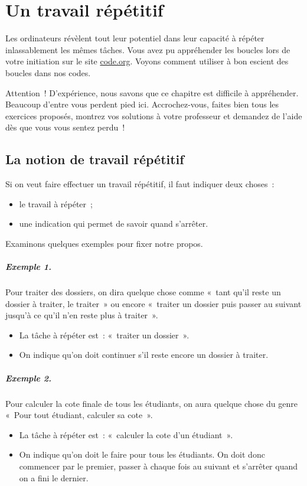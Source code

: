 \chapter{Un travail répétitif}
\label{chap:bcl}

	Les ordinateurs révèlent tout leur potentiel dans leur capacité à
	répéter inlassablement les mêmes tâches.
	Vous avez pu appréhender les boucles lors de votre initiation
	sur le site \url{code.org}.
	Voyons comment utiliser à bon escient des boucles dans nos codes.

	Attention~! 
	D’expérience, nous savons que ce chapitre est difficile à appréhender. 
	Beaucoup d’entre vous perdent pied ici. 
	Accrochez-vous, faites bien tous les exercices proposés,
	montrez vos solutions à votre professeur
	et demandez de l’aide dès que vous vous sentez perdu~!

\section{La notion de travail répétitif}

	Si on veut faire effectuer un travail répétitif, 
	il faut indiquer deux choses~:
	\begin{itemize}
	\item le travail à répéter~;
	\item une indication qui permet de savoir quand s’arrêter.
	\end{itemize}

	Examinons quelques exemples pour fixer notre propos.

	\paragraph{Exemple 1.} 
	Pour traiter des dossiers, 
	on dira quelque chose comme 
	«~tant qu’il reste un dossier à traiter, le traiter~» 
	ou encore 
	«~traiter un dossier puis passer au suivant jusqu’à ce qu’il n’en reste plus à traiter~».
	\begin{itemize}
	\item La tâche à répéter est~: «~traiter un dossier~».
	\item On indique qu’on doit continuer s’il reste encore un dossier à traiter.
	\end{itemize}

	\paragraph{Exemple 2.}
	Pour calculer la cote finale de tous les étudiants,
	on aura quelque chose du genre 
	«~Pour tout étudiant, calculer sa cote~».
	\begin{itemize}
	\item 
		La tâche à répéter est~: «~calculer la cote d’un étudiant~».
	\item 
		On indique qu’on doit le faire pour tous les étudiants.
		On doit donc commencer par le premier, passer à chaque fois au suivant
		et s’arrêter quand on a fini le dernier.
	\end{itemize}

